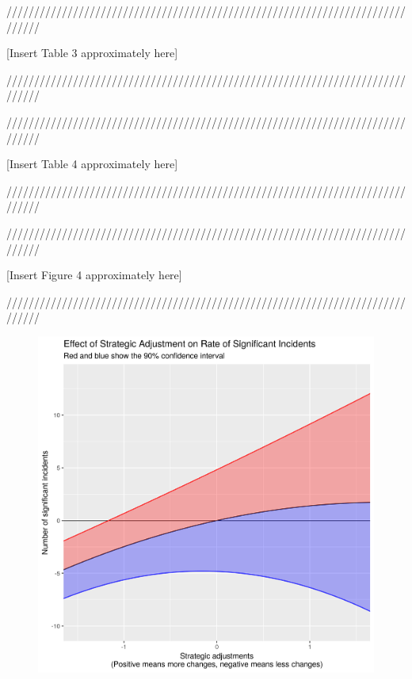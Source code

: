 {\centering
	//////////////////////////////////////////////////////////////////////////////
	
	[Insert Table 3 approximately here]
	
	//////////////////////////////////////////////////////////////////////////////\par
}

\begin{table}
	{\renewcommand\normalsize{\tiny}%
		\normalsize
	}
	\caption{}
\end{table}

{\centering
	//////////////////////////////////////////////////////////////////////////////
	
	[Insert Table 4 approximately here]
	
	//////////////////////////////////////////////////////////////////////////////\par
}

\begin{table}
	{\renewcommand\normalsize{\tiny}%
		\normalsize
		}
	\caption{}
\end{table}

{\centering
	//////////////////////////////////////////////////////////////////////////////
	
	[Insert Figure 4 approximately here]
	
	//////////////////////////////////////////////////////////////////////////////\par
}

\begin{figure}
	\includegraphics{illustrations/effect_size.png}
	\caption{}
\end{figure}
